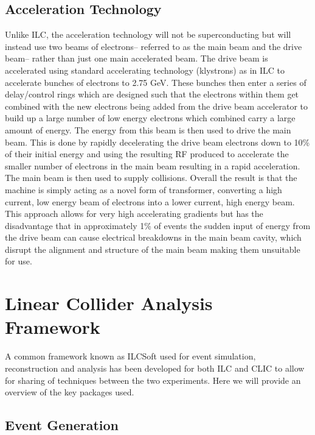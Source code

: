 \subsection{Acceleration Technology}
\label{sect:clicaccelerator}
Unlike \ac{ILC}, the acceleration technology will not be superconducting but will instead use two beams of electrons-- referred to as the main beam and the drive beam-- rather than just one main accelerated beam. The drive beam is accelerated using standard accelerating technology (klystrons) as in \ac{ILC} to accelerate bunches of electrons to 2.75 GeV. These bunches then enter a series of delay/control rings which are designed such that the electrons within them get combined with the new electrons being added from the drive beam accelerator to build up a large number of low energy electrons which combined carry a large amount of energy. The energy from this beam is then used to drive the main beam. This is done by rapidly decelerating the drive beam electrons down to 10\% of their initial energy and using the resulting \ac{RF} produced to accelerate the smaller number of electrons in the main beam resulting in a rapid acceleration. The main beam is then used to supply collisions. Overall the result is that the machine is simply acting as a novel form of transformer, converting a high current, low energy beam of electrons into a lower current, high energy beam. This approach allows for very high accelerating gradients but has the disadvantage that in approximately 1\% of events the sudden input of energy from the drive beam can cause electrical breakdowns in the main beam cavity, which disrupt the alignment and structure of the main beam making them unsuitable for use.

\section{Linear Collider Analysis Framework}

A common framework known as ILCSoft used for event simulation, reconstruction and analysis has been developed for both \ac{ILC} and \ac{CLIC} to allow for sharing of techniques between the two experiments. Here we will provide an overview of the key packages used.

\subsection{Event Generation}

